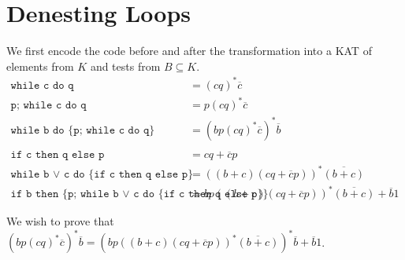 \section{Denesting Loops}

We first encode the code before and after the transformation into a KAT of elements from $K$ and tests from $B \subseteq K$.
\begin{align*}
\texttt{while c do q} &= (cq)^*\overline c\\
\texttt{p; while c do q} &= p(cq)^*\overline c\\
\texttt{while b do \{p; while c do q\}} &= (bp(cq)^*\overline c)^*\overline b\\\\
\texttt{if c then q else p} &= cq + \overline c p\\
\texttt{while b $\vee$ c do \{if c then q else p\}} &= ((b + c)(cq + \overline c p))^*\overline{(b+c)}\\
\texttt{if b then \{p; while b $\vee$ c do \{if c then q else p\}\}} &= bp((b + c)(cq + \overline c p))^*\overline{(b+c)}+ \overline b 1
\end{align*}

We wish to prove that $(bp(cq)^*\overline c)^*\overline b = (bp((b + c)(cq + \overline c p))^*\overline{(b+c)})^*\overline b + \overline b 1$.

